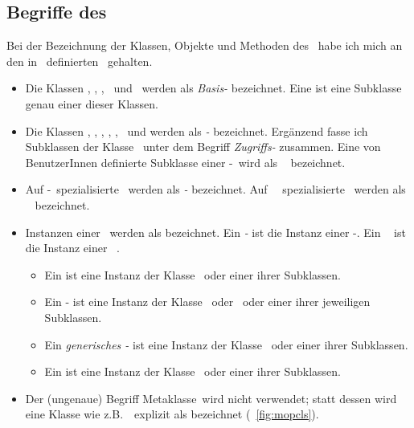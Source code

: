\subsection{Begriffe des \protect\mop}%
%
Bei der Bezeichnung der Klassen, Objekte und Methoden des \mop\ habe
ich mich an den in \ definierten \Std\ gehalten.
\begin{itemize}
%
\item Die Klassen , ,
, \ und
\ werden als {\em Basis-\mc[n]\/}
bezeichnet. Eine {\em\mc\/} ist eine Subklasse genau einer dieser
Klassen.
%
\item Die Klassen ,
,
,
,
,
\ und
 werden als
{\em\std-\mc[n]\/} bezeichnet. Er\-g\"{a}n\-zend fasse ich Subklassen der
Klasse \ unter dem Begriff
{\em Zugriffs-\mtdmc[n]\/} zusammen. Eine von BenutzerInnen definierte
Subklasse einer \std-\mc\ wird als {\em\spc\ \mc\/} bezeichnet.
%
\item Auf \Std-\mc[n]\ spezialisierte \mtd[n]\ werden als
{\em\Std-\mtd[n]\/} bezeichnet. Auf \spc\ \mc[n]\ spezialisierte
\mtd[n]\ werden als {\em\spc\ \mtd[n]\/} bezeichnet.
%
\item Instanzen einer \mc\ werden als {\em\mo[e]\/} bezeichnet. Ein
{\em\Std-\mo\/} ist die Instanz einer \Std-\mc. Ein {\em\spc[s]\ \mo\/}
ist die Instanz einer \spc[n]\ \mc.
\begin{itemize}
%
\item Ein {\em\clsmo\/} ist eine Instanz der Klasse
\ oder einer ihrer Subklassen.
%
\item Ein \Slt-{\em\mo\/} ist eine Instanz der Klasse
\ oder
\ oder
einer ihrer jeweiligen Subklassen.
%
\item Ein {\em generisches \fn[s]-\mo\/} ist eine Instanz der Klasse
\ oder einer ihrer Subklassen.
%
\item Ein {\em\mtdmo\/} ist eine Instanz der Klasse
\ oder einer ihrer Subklassen.
%
\end{itemize}
%
\item Der (ungenaue) Begriff \rglq{}Metaklasse\rgrq\ wird nicht
verwendet; statt dessen wird eine Klasse wie
z.B.\ \ explizit als {\em\clsmc\/} bezeichnet
(\figurename\ \ref{fig:mopcls}).
%
\end{itemize}
